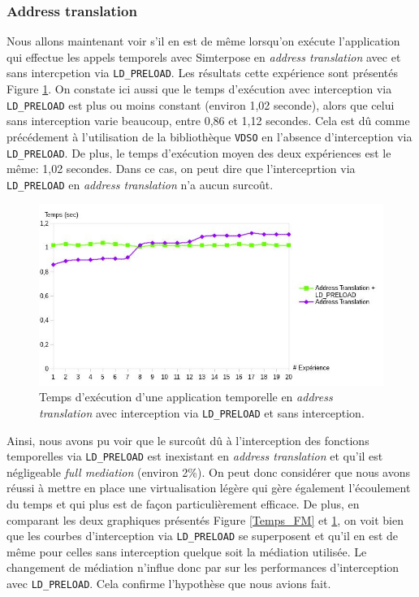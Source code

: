 \subsubsection{Address translation}
Nous allons maintenant voir s'il en est de même  lorsqu'on exécute l'application qui effectue les appels temporels avec Simterpose en \textit{address translation} avec et sans intercpetion via \texttt{LD\_PRELOAD}. Les résultats cette expérience sont présentés Figure \ref{Temps_AT}. On constate ici aussi que le temps d'exécution avec interception via \texttt{LD\_PRELOAD} est plus ou moins constant (environ 1,02 seconde), alors que celui sans interception varie beaucoup, entre 0,86 et 1,12 secondes. Cela est dû comme précédement à l'utilisation de la bibliothèque \texttt{VDSO} en l'absence d'interception via \texttt{LD\_PRELOAD}. De plus, le temps d'exécution moyen des deux expériences est le même: 1,02 secondes. Dans ce cas, on peut dire que l'interceprtion via \texttt{LD\_PRELOAD} en \textit{address translation} n'a aucun surcoût.

\begin{figure}[H]
  \centering
    \includegraphics[scale=0.50]{mesures/graph/Temps_AT.jpg}
    \caption[Temps d'exécution d'une application temporelle en \textit{address translation}]{Temps d'exécution d'une application temporelle en \textit{address translation} avec interception via \texttt{LD\_PRELOAD} et sans interception.}
    \label{Temps_AT}
\end{figure}


Ainsi, nous avons pu voir que le surcoût dû à l'interception des fonctions temporelles via \texttt{LD\_PRELOAD} est inexistant en \textit{address translation} et qu'il est négligeable \textit{full mediation} (environ 2\%). On peut donc considérer que nous avons réussi à mettre en place une virtualisation légère qui gère également l'écoulement du temps et qui plus est de façon particulièrement efficace. De plus, en comparant les deux graphiques présentés Figure \ref{Temps_FM} et \ref{Temps_AT}, on voit bien que les courbes d'interception via \texttt{LD\_PRELOAD} se superposent et qu'il en est de même pour celles sans interception quelque soit la médiation utilisée. Le changement de médiation n'influe donc par sur les performances d'interception avec \texttt{LD\_PRELOAD}. Cela confirme l'hypothèse que nous avions fait.

\vspace{0.5cm}
